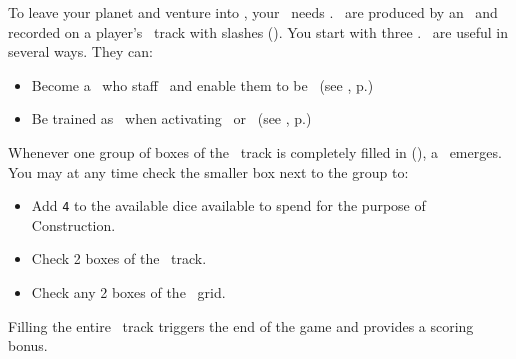 To leave your planet and venture into \outerspace, your \planet\ needs \astronauts.  \astronauts\ are produced by an \academy\ and recorded on a player’s \population\ track with slashes (\gainastronautsymbol).  You start with three \astronauts.
\newline\newline
\astronauts\ are useful in several ways. They can:
\begin{itemize}
	\item Become a \specialist\ who staff \fortifications\ and enable them to be \activated\ (see , p.\pageref{sec:fortifications})
	\item Be trained as \pilots\ when activating \starships\ or \battleships\ (see , p.\pageref{sec:military})
\end{itemize}
Whenever one group of boxes of the \population\ track is completely filled in (\gainastronautsymbol), a \greatperson\ emerges.  You may at any time check the smaller box next to the group to:
\begin{itemize}
  \item Add \texttt{4} to the available dice available to spend for the purpose of Construction.
  \item Check 2 boxes of the \tech\ track.
  \item Check any 2 boxes of the \culture\ grid.
\end{itemize}
Filling the entire \population\ track triggers the end of the game and provides a scoring bonus.
